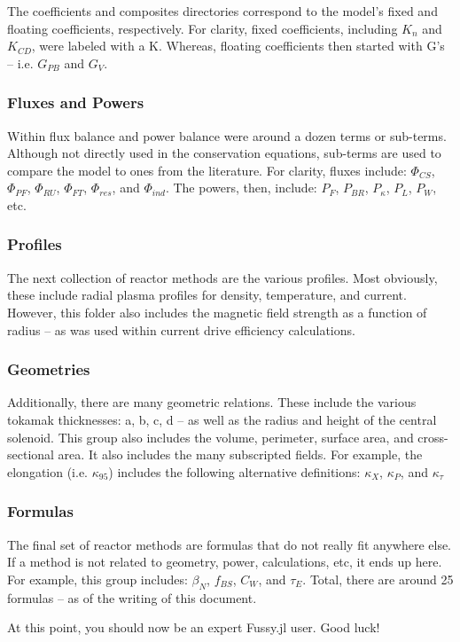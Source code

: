The coefficients and composites directories correspond to the model's fixed and floating coefficients, respectively. For clarity, fixed coefficients, including $K_n$ and $K_{CD}$, were labeled with a K. Whereas, floating coefficients then started with G's -- i.e. $G_{PB}$ and $G_V$.

\subsubsection{Fluxes and Powers}

Within flux balance and power balance were around a dozen terms or sub-terms. Although not directly used in the conservation equations, sub-terms are used to compare the model to ones from the literature. For clarity, fluxes include: $\Phi_{CS}$, $\Phi_{PF}$, $\Phi_{RU}$, $\Phi_{FT}$, $\Phi_{res}$, and $\Phi_{ind}$. The powers, then, include: $P_F$, $P_{BR}$, $P_\kappa$, $P_L$, $P_W$, etc. 

\subsubsection{Profiles}

The next collection of reactor methods are the various profiles. Most obviously, these include radial plasma profiles for density, temperature, and current. However, this folder also includes the magnetic field strength as a function of radius -- as was used within current drive efficiency calculations.

\subsubsection{Geometries}

Additionally, there are many geometric relations. These include the various tokamak thicknesses: a, b, c, d -- as well as the radius and height of the central solenoid. This group also includes the volume, perimeter, surface area, and cross-sectional area. It also includes the many subscripted fields. For example, the elongation (i.e. $\kappa_{95}$) includes the following alternative definitions: $\kappa_X$, $\kappa_P$, and $\kappa_\tau$

\subsubsection{Formulas}

The final set of reactor methods are formulas that do not really fit anywhere else. If a method is not related to geometry, power, calculations, etc, it ends up here. For example, this group includes: $\beta_N$, $f_{BS}$, $C_W$, and $\tau_E$. Total, there are around 25 formulas -- as of the writing of this document.

At this point, you should now be an expert Fussy.jl user. Good luck!